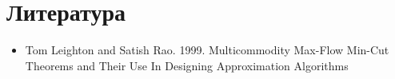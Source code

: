 \documentclass[12pt]{article} %
\begin{document}
\section{Литература}

\begin{itemize}
\item
    Tom Leighton and Satish Rao. 1999. Multicommodity Max-Flow Min-Cut Theorems and Their Use In Designing Approximation Algorithms
\end{itemize}


\nocite{bishop06pattern,hastie09elements,kolmogorov87information,zhuravlev78prob33,langley00crafting,blake98uci}

\def\BibUrl#1.{\\{\footnotesize\tt\def~{\char126} http://#1}}
\def\BibAnnote#1.{}



\end{document}
